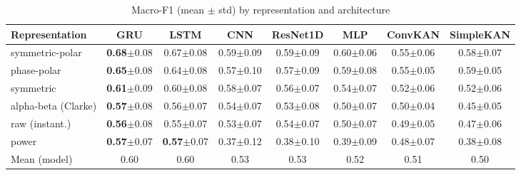\documentclass{ieeeojies}
\begin{document}
\begin{table}[!t]
\caption{Macro-F1 (mean $\pm$ std) by representation and architecture}\label{tab2}
\centering
\begin{tabular}{lccccccc}
\hline
Representation & GRU & LSTM & CNN & ResNet1D & MLP & ConvKAN & SimpleKAN\\ \hline
symmetric-polar & \textbf{0.68}$\pm$0.08 & 0.67$\pm$0.08 & 0.59$\pm$0.09 & 0.59$\pm$0.09 & 0.60$\pm$0.06 & 0.55$\pm$0.06 & 0.58$\pm$0.07\\
phase-polar & \textbf{0.65}$\pm$0.08 & 0.64$\pm$0.08 & 0.57$\pm$0.10 & 0.57$\pm$0.09 & 0.59$\pm$0.08 & 0.55$\pm$0.05 & 0.59$\pm$0.05\\
symmetric & \textbf{0.61}$\pm$0.09 & 0.60$\pm$0.08 & 0.58$\pm$0.07 & 0.56$\pm$0.07 & 0.54$\pm$0.07 & 0.52$\pm$0.06 & 0.52$\pm$0.06\\
alpha-beta (Clarke) & \textbf{0.57}$\pm$0.08 & 0.56$\pm$0.07 & 0.54$\pm$0.07 & 0.53$\pm$0.08 & 0.50$\pm$0.07 & 0.50$\pm$0.04 & 0.45$\pm$0.05\\
raw (instant.) & \textbf{0.56}$\pm$0.08 & 0.55$\pm$0.07 & 0.53$\pm$0.07 & 0.54$\pm$0.07 & 0.50$\pm$0.07 & 0.49$\pm$0.05 & 0.47$\pm$0.06\\
power & \textbf{0.57}$\pm$0.07 & \textbf{0.57}$\pm$0.07 & 0.37$\pm$0.12 & 0.38$\pm$0.10 & 0.39$\pm$0.09 & 0.48$\pm$0.07 & 0.38$\pm$0.08\\ \hline
Mean (model) & 0.60 & 0.60 & 0.53 & 0.53 & 0.52 & 0.51 & 0.50\\ \hline
\end{tabular}
\par\vspace{2pt}{\footnotesize Aggregated over 3 sampling modes $\times$ 3 complexity levels $\times$ 5 folds $\times$ 5 seeds (225 runs per cell). In bold, the best model in the row (GRU everywhere; in the power row, GRU and LSTM).}
\end{table}
\end{document}
